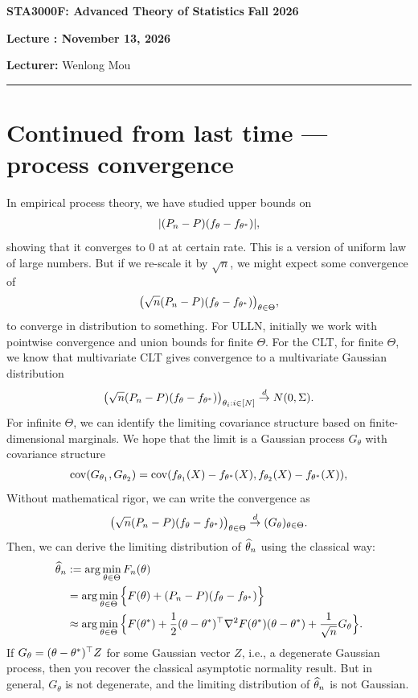 \documentclass[11pt,letterpaper]{article}
\newcommand{\coursenumber}{STA3000F}
\newcommand{\coursetitle}{Advanced Theory of Statistics}
\newcommand{\courseterm}{Fall 2026}
\newcounter{lecture}
\newcommand{\lecturenumber}{\arabic{lecture}}
\newcommand{\lecturedate}{November 13, 2026}
\newcommand{\lecturer}{Wenlong Mou}
\numberwithin{theorem}{lecture}
\numberwithin{proposition}{lecture}
\numberwithin{lemma}{lecture}
\numberwithin{claim}{lecture}
\numberwithin{corollary}{lecture}
\numberwithin{definition}{lecture}
\numberwithin{conjecture}{lecture}
\numberwithin{remark}{lecture}
\numberwithin{example}{lecture}
\numberwithin{equation}{lecture}
\newcommand{\makelecturenotesheader}{%
  \noindent
  \textbf{\coursenumber: \coursetitle}%
  \hfill
  \textbf{\courseterm}

  \begin{center}
    {\Large\bfseries Lecture \lecturenumber: \lecturedate}
  \end{center}

  \noindent
  \textbf{Lecturer:} \lecturer
  \par\medskip
  \hrule
  \bigskip
}
\begin{document}
\makelecturenotesheader

\section{Continued from last time --- process convergence}
In empirical process theory, we have studied upper bounds on
\begin{align}
  |(P_n - P) (f_\theta - f_{{\theta^*}})|,
\end{align}
showing that it converges to $0$ at at certain rate. This is a version of uniform law of large numbers. But if we re-scale it by $\sqrt{n}$, we might expect some convergence of
\begin{align}
  \big(\sqrt{n} (P_n - P) (f_\theta - f_{{\theta^*}}) \big)_{\theta \in \Theta},
\end{align}
to converge in distribution to something. For ULLN, initially we work with pointwise convergence and union bounds for finite $\Theta$. For the CLT, for finite $\Theta$, we know that multivariate CLT gives convergence to a multivariate Gaussian distribution
\begin{align*}
  \big(\sqrt{n} (P_n - P) (f_\theta - f_{{\theta^*}}) \big)_{\theta_i: i \in [N]} \overset{d}{\to} N(0, \Sigma).
\end{align*}
For infinite $\Theta$, we can identify the limiting covariance structure based on finite-dimensional marginals. We hope that the limit is a Gaussian process $G_\theta$ with covariance structure
\begin{align*}
  \operatorname{cov} (G_{\theta_1}, G_{\theta_2}) = \operatorname{cov} (f_{\theta_1} (X) - f_{{\theta^*}} (X), f_{\theta_2} (X) - f_{{\theta^*}} (X)),
\end{align*}
Without mathematical rigor, we can write the convergence as
\begin{align*}
  \big(\sqrt{n} (P_n - P) (f_\theta - f_{{\theta^*}}) \big)_{\theta \in \Theta} \overset{d}{\to} (G_\theta)_{\theta \in \Theta}.
\end{align*}
Then, we can derive the limiting distribution of $\widehat{\theta}_n$ using the classical way:
\begin{align*}
  \widehat{\theta}_n &:= \arg\min_{\theta \in \Theta} F_n (\theta)\\
  &= \arg\min_{\theta \in \Theta} \Big\{ F(\theta) +  (P_n - P) (f_\theta - f_{{\theta^*}}) \Big\}\\
  &\approx \arg\min_{\theta \in \Theta} \Big\{ F({\theta^*}) + \frac{1}{2} (\theta - {\theta^*})^\top \nabla^2 F ({\theta^*}) (\theta - {\theta^*}) + \frac{1}{\sqrt{n}} G_\theta \Big\}.
\end{align*}
If $G_\theta = (\theta - {\theta^*})^\top Z$ for some Gaussian vector $Z$, i.e., a degenerate Gaussian process, then you recover the classical asymptotic normality result. But in general, $G_\theta$ is not degenerate, and the limiting distribution of $\widehat{\theta}_n$ is not Gaussian.
\end{document}
